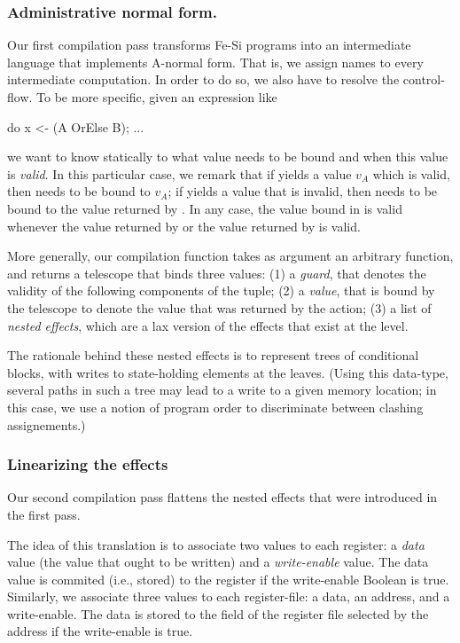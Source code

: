 \documentclass{llncs}
\begin{document}
\subsubsection{Administrative normal form.} Our first compilation pass
transforms Fe-Si programs into an intermediate language that
implements A-normal form. That is, we assign names to every
intermediate computation.
%
In order to do so, we also have to resolve the control-flow. To be
more specific, given an expression like
\begin{coq}
do x <- (A OrElse B); ... 
\end{coq}
we want to know statically to what value  needs to be bound
and when this value is \emph{valid}. 
%
In this particular case, we remark that if  yields a value
$v_A$ which is valid, then  needs to be bound to $v_A$; if
 yields a value that is invalid, then  needs to be
bound to the value returned by . In any case, the value bound
in  is valid whenever the value returned by  or the
value returned by  is valid.

More generally, our compilation function takes as argument an
arbitrary function, and returns a telescope that binds three values:
(1) a \emph{guard}, that denotes the validity of the following
components of the tuple; %
(2) a \emph{value}, that is bound by the telescope to denote the value
that was returned by the action; %
(3) a list of \emph{nested effects}, which are a lax version of the
effects that exist at the  level.

The rationale behind these nested effects is to represent trees of
conditional blocks, with writes to state-holding elements at the
leaves. (Using this data-type, several paths in such a tree may lead
to a write to a given memory location; in this case, we use a notion
of program order to discriminate between clashing assignements.)

\subsubsection{Linearizing the effects} Our second compilation pass
flattens the nested effects that were introduced in the first pass.

The idea of this translation is to associate two values to each
register: a \emph{data} value (the value that ought to be written) and
a \emph{write-enable} value. The data value is commited (i.e., stored)
to the register if the write-enable Boolean is true.
%
Similarly, we associate three values to each register-file: a data, an
address, and a write-enable. The data is stored to the field of the
register file selected by the address if the write-enable is true.  
\end{document}
